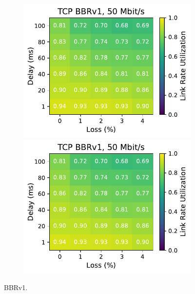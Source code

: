 \begin{figure}[ht]
\begin{subfigure}[b]{0.89cm}
        \includegraphics[width=\linewidth,trim={8cm 0 0 0},clip]{splitting/figures/heatmaps/heatmap_tcp_bbr1_50mbps.pdf}
        \includegraphics[width=\linewidth,trim={8cm 0 0 0},clip]{splitting/figures/heatmaps/heatmap_tcp_bbr1_50mbps.pdf}
        \vspace*{0.2cm}
    \end{subfigure}
    \caption{BBRv1.}
\end{figure}

